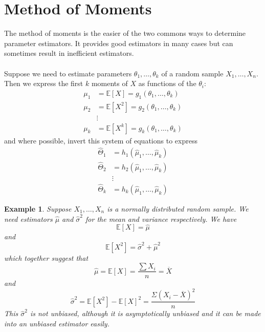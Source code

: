 \documentclass[1pt]{report}
\newtheorem{eg}[thm]{Example}
\newcommand{\<}{\langle}
\renewcommand{\>}{\rangle}
\renewcommand{\bar}{\overline}
\newcommand{\E}{\mathbb{E}}
\begin{document}
\section{Method of Moments}\label{sec:methodofmoments}
The method of moments is the easier of the two commons ways to determine parameter estimators. It provides good estimators in many cases but can sometimes result in inefficient estimators.\\
\\
Suppose we need to estimate parameters $\theta_1, \dots, \theta_k$ of a random sample $X_1, \dots, X_n$. Then we express the first $k$ moments of $X$ as functions of the $\theta_i$:
\begin{align*}
\mu_1 &= \E[X] = g_1(\theta_1, \dots, \theta_k)\\
\mu_2 &= \E[X^2] = g_2(\theta_1,\dots, \theta_k)\\
&\vdots \\
\mu_k & = \E[X^k] = g_k(\theta_1, \dots, \theta_k)
\end{align*}
and where possible, invert this system of equations to express
\begin{align*}
\hat \Theta_1 &= h_1(\hat \mu_1, \dots, \hat \mu_k)\\
\hat \Theta_2 &= h_2(\hat \mu_1, \dots, \hat \mu_k)\\
& \vdots\\ 
\hat \Theta_k &= h_k(\hat \mu_1, \dots, \hat\mu_k)
\end{align*}
\begin{eg}
Suppose $X_1, \dots, X_n$ is a normally distributed random sample. We need estimators $\hat\mu$ and $\hat \sigma^2$ for the mean and variance respectively. We have
$$\E[X] = \hat \mu$$
and 
$$\E[X^2] = \hat \sigma^2 + \hat\mu^2$$
which together suggest that 
$$\hat \mu = \E[X] = \dfrac{\sum X_i}{n} = \bar X$$
and 
$$\hat\sigma^2 = \E[X^2] - \E[X]^2 = \dfrac{\Sigma \left(X_i - \bar X\right)^2}{n}$$
This $\hat\sigma^2$ is not unbiased, although it is asymptotically unbiased and it can be made into an unbiased estimator easily.
\end{eg}
\end{document}

